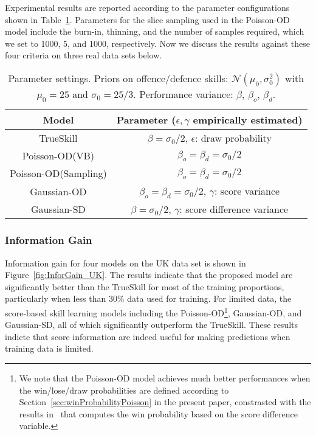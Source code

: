 Experimental results are reported according to the parameter
configurations shown in Table~\ref{table:Parameters}. Parameters for the slice sampling used in the Poisson-OD model include the burn-in, thinning, and the number of samples required, which we set to 1000, 5, and 1000, respectively. 
Now we discuss the results against these four criteria on three real data sets below. 
\begin{table}[htbp!]
\caption{Parameter settings. Priors on offence/defence skills: $\mathcal{N}(\mu_{0},\sigma_{0}^2)$ with $\mu_{0}=25$ and $\sigma_{0}=25/3$. Performance variance: $\beta$, $\beta_o$, $\beta_d$.}
\begin{center}
\small
\begin{tabular}{cc}
  \hline
  Model             & Parameter ($\epsilon,\gamma$ empirically estimated)\\
  \hline
  TrueSkill          & $\beta=\sigma_{0}/2$, $\epsilon$: draw probability\\
  Poisson-OD(VB)         & $\beta_o=\beta_d=\sigma_{0}/2$\\
  Poisson-OD(Sampling)         & $\beta_o=\beta_d=\sigma_{0}/2$\\
  Gaussian-OD    & $\beta_o=\beta_d=\sigma_{0}/2$, $\gamma$: score variance\\
  Gaussian-SD & $\beta=\sigma_{0}/2$, $\gamma$: score difference variance\\
  \hline
\end{tabular}
\label{table:Parameters}
\end{center}
\end{table}

\subsubsection{Information Gain}
Information gain for four models on the UK data set is shown in Figure~\ref{fig:InforGain_UK}. The results indicate that the proposed model are significantly better than the TrueSkill for most of the training proportions, particularly when less than 30\% data used for training. For limited data, the score-based skill learning models including the Poisson-OD\footnote{We note that the Poisson-OD model achieves much better performances when the win/lose/draw probabilities  are defined according to Section~\ref{sec:winProbabilityPoisson} in the present paper, constrasted with the results in~\cite{Guo:ECML2012} that computes the win probability based on the score difference variable.}, Gaussian-OD, and Gaussian-SD, all of which significantly outperform the TrueSkill. These results indicte that score information are indeed useful for making predictions when training data is limited. 

